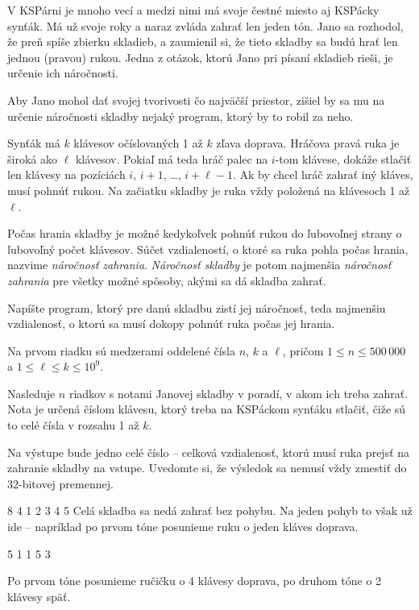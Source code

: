 




V KSPárni je mnoho vecí a medzi nimi má svoje čestné miesto aj KSPácky synťák.
Má už svoje roky a naraz zvláda zahrať len jeden tón. Jano sa rozhodol,
že preň spíše zbierku skladieb, a zaumienil si, že tieto skladby sa budú
hrať len jednou (pravou) rukou. Jedna z otázok, ktorú Jano pri písaní skladieb rieši,
je určenie ich náročnosti.

Aby Jano mohol dať svojej tvorivosti čo najväčší priestor, zišiel by sa mu na
určenie náročnosti skladby nejaký program, ktorý by to robil za neho.


Synťák má $k$ klávesov očíslovaných 1 až $k$ zľava doprava.
Hráčova pravá ruka je široká ako $\ell$ klávesov. Pokiaľ má teda hráč palec na $i$-tom klávese, dokáže stlačiť len klávesy
na pozíciách $i$, $i+1$, \dots, $i+\ell-1$. Ak by chcel hráč zahrať iný kláves, musí pohnúť rukou.
Na začiatku skladby je ruka vždy položená na klávesoch 1 až $\ell$.

Počas hrania skladby je možné kedykoľvek pohnúť rukou do ľubovoľnej strany o ľubovoľný počet klávesov.
Súčet vzdialeností, o ktoré sa ruka pohla počas hrania, nazvime \emph{náročnosť zahrania}.
\emph{Náročnosť skladby} je potom najmenšia \emph{náročnosť zahrania} pre všetky možné spôsoby, akými sa dá skladba zahrať.

Napíšte program, ktorý pre danú skladbu zistí jej náročnosť, teda najmenšiu vzdialenosť, o ktorú sa musí
dokopy pohnúť ruka počas jej hrania.



Na prvom riadku sú medzerami oddelené čísla $n$, $k$ a $\ell$, pričom $1\leq n\leq 500\,000$ a
$1\leq \ell\leq k\leq 10^9$.

Nasleduje $n$ riadkov s notami
Janovej skladby v poradí, v akom ich treba zahrať. Nota je určená číslom klávesu,
ktorý treba na KSPáckom synťáku stlačiť, čiže sú to celé čísla v rozsahu 1 až $k$.  


Na výstupe bude jedno celé číslo -- celková vzdialenosť, ktorú musí ruka prejsť na zahranie
skladby na vstupe. Uvedomte si, že výsledok sa nemusí vždy zmestiť do 32-bitovej premennej.


 8 4
1
2
3
4
5
\komentar
Celá skladba sa nedá zahrať bez pohybu. Na jeden pohyb to však už ide --
napríklad po prvom tóne posunieme ruku o jeden kláves doprava.
\koniec

 5 1
1
5
3

\komentar
Po prvom tóne posunieme ručičku o 4 klávesy doprava, po druhom tóne o 2 klávesy
späť.

\koniec



